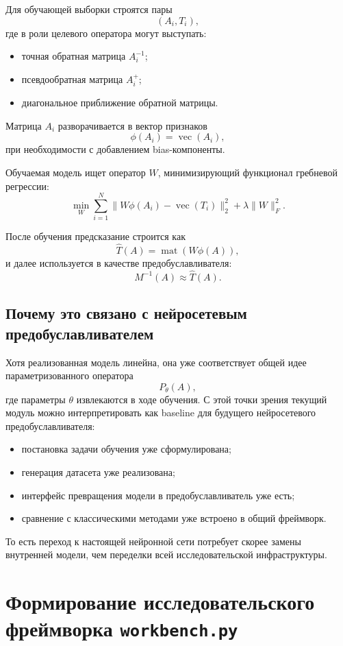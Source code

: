 \documentclass[12pt,a4paper]{article}
\begin{document}
Для обучающей выборки строятся пары
\[
(A_i, T_i),
\]
где в роли целевого оператора могут выступать:
\begin{itemize}[leftmargin=*]
    \item точная обратная матрица $A_i^{-1}$;
    \item псевдообратная матрица $A_i^+$;
    \item диагональное приближение обратной матрицы.
\end{itemize}

Матрица $A_i$ разворачивается в вектор признаков
\[
\phi(A_i)=\operatorname{vec}(A_i),
\]
при необходимости с добавлением bias-компоненты.

Обучаемая модель ищет оператор $W$, минимизирующий функционал гребневой регрессии:
\[
\min_W \sum_{i=1}^{N}\|W\phi(A_i)-\operatorname{vec}(T_i)\|_2^2 + \lambda \|W\|_F^2.
\]

После обучения предсказание строится как
\[
\widehat{T}(A)=\operatorname{mat}(W\phi(A)),
\]
и далее используется в качестве предобуславливателя:
\[
M^{-1}(A)\approx \widehat{T}(A).
\]

\subsection{Почему это связано с нейросетевым предобуславливателем}

Хотя реализованная модель линейна, она уже соответствует общей идее параметризованного оператора
\[
P_\theta(A),
\]
где параметры $\theta$ извлекаются в ходе обучения. С этой точки зрения текущий модуль можно интерпретировать как baseline для будущего нейросетевого предобуславливателя:
\begin{itemize}[leftmargin=*]
    \item постановка задачи обучения уже сформулирована;
    \item генерация датасета уже реализована;
    \item интерфейс превращения модели в предобуславливатель уже есть;
    \item сравнение с классическими методами уже встроено в общий фреймворк.
\end{itemize}

То есть переход к настоящей нейронной сети потребует скорее замены внутренней модели, чем переделки всей исследовательской инфраструктуры.

\section{Формирование исследовательского фреймворка \texttt{workbench.py}}
\end{document}
